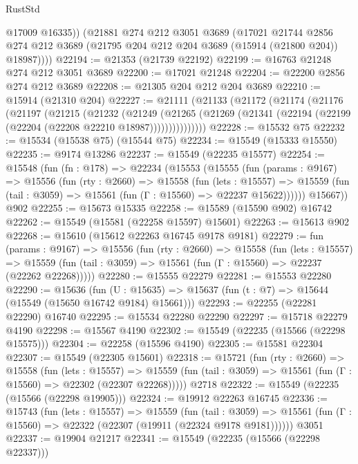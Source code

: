 \begin{lexlean}{RustStd}
\begin{coremodule}
          @17009
          @16335))
      (@21881
        @274
        @212
        @3051
        @3689
        (@17021
          @21744
          @2856
          @274
          @212
          @3689
          (@21795 @204 @212 @204 @3689 (@15914 (@21800 @204)) @18987))))
@22194 := @21353 (@21739 @22192)
@22199 := @16763 @21248 @274 @212 @3051 @3689
@22200 := @17021 @21248
@22204 := @22200 @2856 @274 @212 @3689
@22208 := @21305 @204 @212 @204 @3689
@22210 := @15914 (@21310 @204)
@22227 := @21111
    (@21133
      (@21172
        (@21174
          (@21176
            (@21197
              (@21215
                (@21232
                  (@21249
                    (@21265
                      (@21269 (@21341 (@22194 (@22199 (@22204 (@22208 @22210 @18987)))))))))))))))
@22228 := @15532 @75
@22232 := @15534 (@15538 @75) (@15544 @75)
@22234 := @15549 (@15333 @15550)
@22235 := @9174 @13286
@22237 := @15549 (@22235 @15577)
@22254 := @15548
    (fun (fn : @178) =>
    @22234
      (@15553
        (@15555
          (fun (params : @9167) =>
          @15556
            (fun (rty : @2660) =>
            @15558
              (fun (lets : @15557) =>
              @15559 (fun (tail : @3059) => @15561 (fun (Γ : @15560) => @22237 @15622))))))
        @15667))
    @902
@22255 := @15673 @15335
@22258 := @15589 (@15590 @902) @16742
@22262 := @15549 (@15581 (@22258 @15597) @15601)
@22263 := @15613 @902
@22268 := @15610 (@15612 @22263 @16745 @9178 @9181)
@22279 := fun (params : @9167) =>
  @15556
    (fun (rty : @2660) =>
    @15558
      (fun (lets : @15557) =>
      @15559 (fun (tail : @3059) => @15561 (fun (Γ : @15560) => @22237 (@22262 @22268)))))
@22280 := @15555 @22279
@22281 := @15553 @22280
@22290 := @15636
    (fun (U : @15635) => @15637 (fun (t : @7) => @15644 (@15549 (@15650 @16742 @9184) @15661)))
@22293 := @22255 (@22281 @22290) @16740
@22295 := @15534 @22280 @22290
@22297 := @15718 @22279 @4190
@22298 := @15567 @4190
@22302 := @15549 (@22235 (@15566 (@22298 @15575)))
@22304 := @22258 (@15596 @4190)
@22305 := @15581 @22304
@22307 := @15549 (@22305 @15601)
@22318 := @15721
    (fun (rty : @2660) =>
    @15558
      (fun (lets : @15557) =>
      @15559 (fun (tail : @3059) => @15561 (fun (Γ : @15560) => @22302 (@22307 @22268)))))
    @2718
@22322 := @15549 (@22235 (@15566 (@22298 @19905)))
@22324 := @19912 @22263 @16745
@22336 := @15743
    (fun (lets : @15557) =>
    @15559
      (fun (tail : @3059) =>
      @15561 (fun (Γ : @15560) => @22322 (@22307 (@19911 (@22324 @9178 @9181))))))
    @3051
@22337 := @19904 @21217
@22341 := @15549 (@22235 (@15566 (@22298 @22337)))

\end{coremodule}
\end{lexlean}
